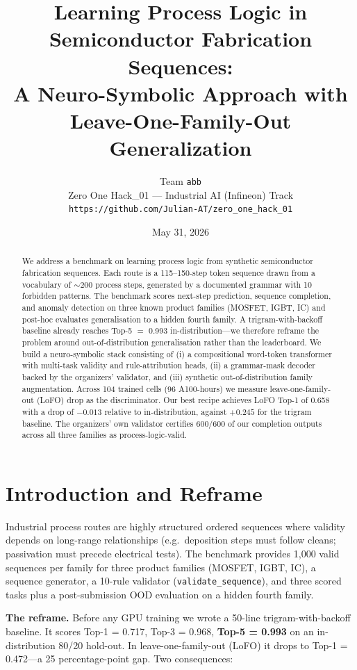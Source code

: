 \documentclass[11pt,a4paper]{article}
\title{\textbf{Learning Process Logic in Semiconductor Fabrication Sequences:\\
A Neuro-Symbolic Approach with Leave-One-Family-Out Generalization}}
\author{Team \texttt{abb}\\
\small Zero One Hack\_01 --- Industrial AI (Infineon) Track\\
\small\texttt{https://github.com/Julian-AT/zero\_one\_hack\_01}}
\date{May 31, 2026}
\begin{document}
\maketitle

\begin{abstract}
\noindent We address a benchmark on learning process logic from synthetic semiconductor fabrication sequences. Each route is a 115--150-step token sequence drawn from a vocabulary of $\sim$200 process steps, generated by a documented grammar with 10 forbidden patterns. The benchmark scores next-step prediction, sequence completion, and anomaly detection on three known product families (MOSFET, IGBT, IC) and post-hoc evaluates generalisation to a hidden fourth family. A trigram-with-backoff baseline already reaches Top-5 $=$ 0.993 in-distribution---we therefore reframe the problem around out-of-distribution generalisation rather than the leaderboard. We build a neuro-symbolic stack consisting of (i) a compositional word-token transformer with multi-task validity and rule-attribution heads, (ii) a grammar-mask decoder backed by the organizers' validator, and (iii) synthetic out-of-distribution family augmentation. Across 104 trained cells (96 A100-hours) we measure leave-one-family-out (LoFO) drop as the discriminator. Our best recipe achieves LoFO Top-1 of 0.658 with a drop of $-0.013$ relative to in-distribution, against $+0.245$ for the trigram baseline. The organizers' own validator certifies $600/600$ of our completion outputs across all three families as process-logic-valid.
\end{abstract}

\section{Introduction and Reframe}\label{sec:intro}

Industrial process routes are highly structured ordered sequences where validity depends on long-range relationships (e.g.\ deposition steps must follow cleans; passivation must precede electrical tests). The benchmark provides 1{,}000 valid sequences per family for three product families (MOSFET, IGBT, IC), a sequence generator, a 10-rule validator (\texttt{validate\_sequence}), and three scored tasks plus a post-submission OOD evaluation on a hidden fourth family.

\textbf{The reframe.} Before any GPU training we wrote a 50-line trigram-with-backoff baseline. It scores Top-1 = 0.717, Top-3 = 0.968, \textbf{Top-5 = 0.993} on an in-distribution 80/20 hold-out. In leave-one-family-out (LoFO) it drops to Top-1 = 0.472---a 25 percentage-point gap. Two consequences:
\end{document}
